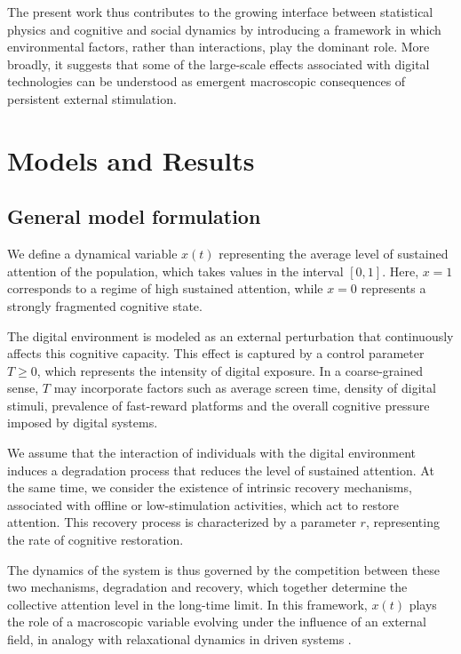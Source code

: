 \documentclass[preprint,12pt]{elsarticle}
\begin{document}
The present work thus contributes to the growing interface between statistical physics and cognitive and social dynamics by introducing a framework in which environmental factors, rather than interactions, play the dominant role. More broadly, it suggests that some of the large-scale effects associated with digital technologies can be understood as emergent macroscopic consequences of persistent external stimulation.





\section{Models and Results}


\subsection{General model formulation}

We define a dynamical variable $x(t)$ representing the average level of sustained attention of the population, which takes values in the interval $[0,1]$. Here, $x=1$ corresponds to a regime of high sustained attention, while $x=0$ represents a strongly fragmented cognitive state.

The digital environment is modeled as an external perturbation that continuously affects this cognitive capacity. This effect is captured by a control parameter $T \geq 0$, which represents the intensity of digital exposure. In a coarse-grained sense, $T$ may incorporate factors such as average screen time, density of digital stimuli, prevalence of fast-reward platforms and the overall cognitive pressure imposed by digital systems.

We assume that the interaction of individuals with the digital environment induces a degradation process that reduces the level of sustained attention. At the same time, we consider the existence of intrinsic recovery mechanisms, associated with offline or low-stimulation activities, which act to restore attention. This recovery process is characterized by a parameter $r$, representing the rate of cognitive restoration.

The dynamics of the system is thus governed by the competition between these two mechanisms, degradation and recovery, which together determine the collective attention level in the long-time limit. In this framework, $x(t)$ plays the role of a macroscopic variable evolving under the influence of an external field, in analogy with relaxational dynamics in driven systems \cite{Hohenberg,Goldenfeld}.
\end{document}
